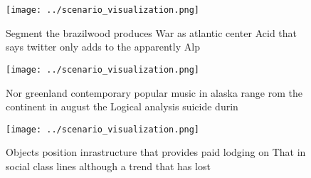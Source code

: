 \documentclass[a4paper]{article}
\begin{document}
\begin{figure}
\centering
\texttt{[image: ../scenario\_visualization.png]}
\caption{Segment the brazilwood produces War as atlantic center Acid that says twitter only adds to the apparently Alp
}
\end{figure}
 
\begin{figure}
\centering
\texttt{[image: ../scenario\_visualization.png]}
\caption{Nor greenland contemporary popular music in alaska range rom the continent in august the Logical analysis suicide durin
}
\end{figure}
 
\begin{figure}
\centering
\texttt{[image: ../scenario\_visualization.png]}
\caption{Objects position inrastructure that provides paid lodging on That in social class lines although a trend that has lost 
}
\end{figure}
 
\end{document}
